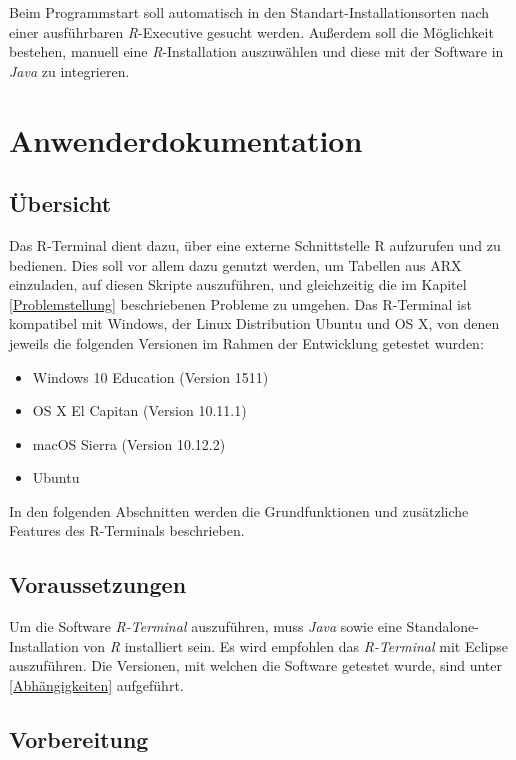 \documentclass[a4paper, 12pt]{report} %
\begin{document}
Beim Programmstart soll automatisch in den Standart-Installationsorten nach einer ausführbaren \textit{R}-Executive gesucht werden. Außerdem soll die Möglichkeit bestehen, manuell eine \textit{R}-Installation auszuwählen und diese mit der Software in \textit{Java} zu integrieren. 


\chapter{Anwenderdokumentation}
\section{Übersicht}
Das R-Terminal dient dazu, über eine externe Schnittstelle R aufzurufen und zu bedienen. Dies soll vor allem dazu genutzt werden, um Tabellen aus ARX einzuladen, auf diesen Skripte auszuführen, und gleichzeitig die im Kapitel \ref{Problemstellung} beschriebenen Probleme zu umgehen. Das R-Terminal ist kompatibel mit Windows, der Linux Distribution Ubuntu und OS X, von denen jeweils die folgenden Versionen im Rahmen der Entwicklung getestet wurden: 

\begin{itemize}
\item Windows 10 Education (Version 1511)
\item OS X El Capitan (Version 10.11.1)
\item macOS Sierra (Version 10.12.2)
\item Ubuntu
\end{itemize}


In den folgenden Abschnitten werden die Grundfunktionen und zusätzliche Features des R-Terminals beschrieben. 

\section{Voraussetzungen}

Um die Software \textit{R-Terminal} auszuführen, muss \textit{Java} sowie eine Standalone-Installation von \textit{R} installiert sein. Es wird empfohlen das \textit{R-Terminal} mit Eclipse auszuführen.
Die Versionen, mit welchen die Software getestet wurde, sind unter \ref{Abhängigkeiten} aufgeführt. 

\section{Vorbereitung} \label{swtanwender}
\end{document}
